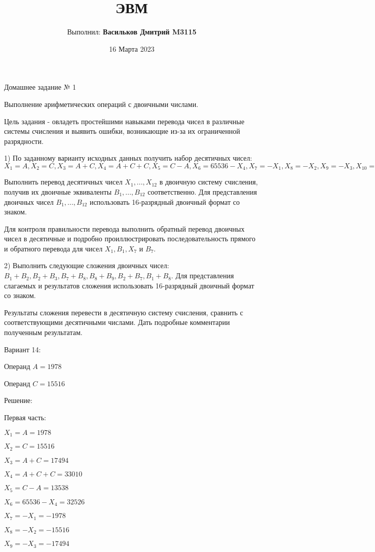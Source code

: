 \documentclass{article}
\title{ЭВМ}
\author{Выполнил: \textbf{Васильков Дмитрий M3115}}
\date{16 Марта 2023}
\begin{document}
\maketitle


Домашнее задание № 1

Выполнение арифметических операций с двоичными числами.

Цель задания - овладеть простейшими навыками перевода чисел в различные системы счисления и выявить ошибки, возникающие из-за их ограниченной разрядности.

1) По заданному варианту исходных данных получить набор десятичных чисел: $X_1=A, X_2=C, X_3=A+C, X_4=A+C+C, X_5=C-A, X_6=65536-X_4, X_7=-X_1, X_8=-X_2, X_9=-X_3, X_{10}=-X_4, X_{11}=-X_5, X_{12}=-X_6.$

Выполнить перевод десятичных чисел $X_1,...,X_{12}$ в двоичную систему счисления, получив их двоичные эквиваленты $B_1,...,B_{12}$ соответственно. Для представления двоичных чисел $B_1,...,B_{12}$ использовать 16-разрядный двоичный формат со знаком.

Для контроля правильности перевода выполнить обратный перевод двоичных чисел в десятичные и подробно проиллюстрировать последовательность прямого и обратного перевода для чисел $X_1, B_1, X_7$ и $B_7$.

2) Выполнить следующие сложения двоичных чисел: $B_1+B_2, B_2+B_3, B_7+B_8, B_8+B_9, B_2+B_7, B_1+B_8.$ Для представления слагаемых и результатов сложения использовать 16-разрядный двоичный формат со знаком.

Результаты сложения перевести в десятичную систему счисления, сравнить с соответствующими десятичными числами. Дать подробные комментарии полученным результатам.

Вариант 14:

Операнд $A = 1978$

Операнд $C = 15516$

Решение:

Первая часть:

$X_1 = A = 1978$

$X_2 = C = 15516$

$X_3 = A + C = 17494$

$X_4 = A + C + C = 33010$

$X_5 = C - A = 13538$

$X_6 = 65536 - X_4 = 32526$

$X_7 = -X_1 = -1978$

$X_8 = -X_2 = -15516$

$X_9 = -X_3 = -17494$
\end{document}
